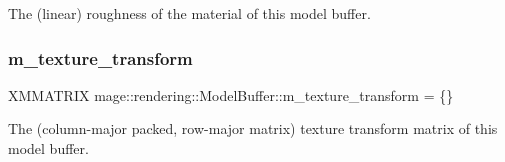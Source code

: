 The (linear) roughness of the material of this model buffer. \mbox{\label{structmage_1_1rendering_1_1_model_buffer_a89ae6a1222a84b0f166f5e46b35411b6}} 
\subsubsection{\texorpdfstring{m\+\_\+texture\+\_\+transform}{m\_texture\_transform}}
{\footnotesize\ttfamily X\+M\+M\+A\+T\+R\+IX mage\+::rendering\+::\+Model\+Buffer\+::m\+\_\+texture\+\_\+transform = \{\}}

The (column-\/major packed, row-\/major matrix) texture transform matrix of this model buffer. 